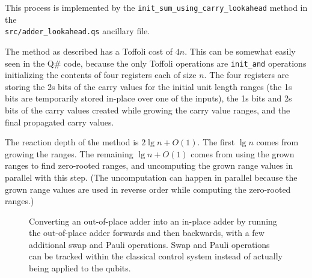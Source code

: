 \documentclass[onecolumn,unpublished]{quantumarticle}
\theoremstyle{definition}
\theoremstyle{definition}
\theoremstyle{definition}
\begin{document}
This process is implemented by the \texttt{init\_sum\_using\_carry\_lookahead} method in the \\\texttt{src/adder\_lookahead.qs} ancillary file.

The method as described has a Toffoli cost of $4n$.
This can be somewhat easily seen in the Q\# code, because the only Toffoli operations are \texttt{init\_and} operations initializing the contents of four registers each of size $n$.
The four registers are storing the 2s bits of the carry values for the initial unit length ranges (the 1s bits are temporarily stored in-place over one of the inputs), the 1s bits and 2s bits of the carry values created while growing the carry value ranges, and the final propagated carry values.

The reaction depth of the method is $2 \lg n  + O(1)$.
The first $\lg n$ comes from growing the ranges.
The remaining $\lg n + O(1)$ comes from using the grown ranges to find zero-rooted ranges, and uncomputing the grown range values in parallel with this step.
(The uncomputation can happen in parallel because the grown range values are used in reverse order while computing the zero-rooted ranges.)

\begin{figure}
\centering
{}
    \caption{
        Converting an out-of-place adder into an in-place adder by running the out-of-place adder forwards and then backwards, with a few additional swap and Pauli operations.
        Swap and Pauli operations can be tracked within the classical control system instead of actually being applied to the qubits.
    }
    \label{fig:oop2ip}
\end{figure}
\end{document}

